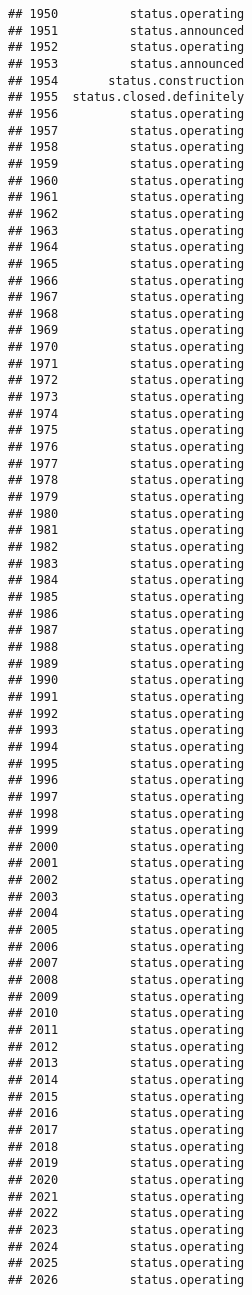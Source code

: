 \documentclass[
]{article}
\begin{document}
\begin{verbatim}
## 1950          status.operating
## 1951          status.announced
## 1952          status.operating
## 1953          status.announced
## 1954       status.construction
## 1955  status.closed.definitely
## 1956          status.operating
## 1957          status.operating
## 1958          status.operating
## 1959          status.operating
## 1960          status.operating
## 1961          status.operating
## 1962          status.operating
## 1963          status.operating
## 1964          status.operating
## 1965          status.operating
## 1966          status.operating
## 1967          status.operating
## 1968          status.operating
## 1969          status.operating
## 1970          status.operating
## 1971          status.operating
## 1972          status.operating
## 1973          status.operating
## 1974          status.operating
## 1975          status.operating
## 1976          status.operating
## 1977          status.operating
## 1978          status.operating
## 1979          status.operating
## 1980          status.operating
## 1981          status.operating
## 1982          status.operating
## 1983          status.operating
## 1984          status.operating
## 1985          status.operating
## 1986          status.operating
## 1987          status.operating
## 1988          status.operating
## 1989          status.operating
## 1990          status.operating
## 1991          status.operating
## 1992          status.operating
## 1993          status.operating
## 1994          status.operating
## 1995          status.operating
## 1996          status.operating
## 1997          status.operating
## 1998          status.operating
## 1999          status.operating
## 2000          status.operating
## 2001          status.operating
## 2002          status.operating
## 2003          status.operating
## 2004          status.operating
## 2005          status.operating
## 2006          status.operating
## 2007          status.operating
## 2008          status.operating
## 2009          status.operating
## 2010          status.operating
## 2011          status.operating
## 2012          status.operating
## 2013          status.operating
## 2014          status.operating
## 2015          status.operating
## 2016          status.operating
## 2017          status.operating
## 2018          status.operating
## 2019          status.operating
## 2020          status.operating
## 2021          status.operating
## 2022          status.operating
## 2023          status.operating
## 2024          status.operating
## 2025          status.operating
## 2026          status.operating

\end{verbatim}
\end{document}
